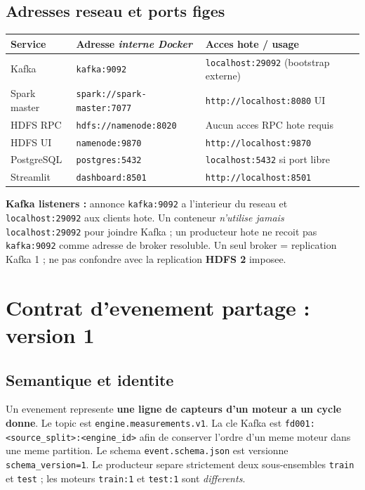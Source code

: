 \documentclass[10pt,a4paper]{article}
\newcommand{\code}[1]{{\small\ttfamily\nolinkurl{#1}}}
\begin{document}
\subsection{Adresses reseau et ports figes}
\begin{tabularx}{\linewidth}{@{}p{30mm}p{46mm}Y@{}}
\toprule
\textbf{Service} & \textbf{Adresse \emph{interne Docker}} & \textbf{Acces hote / usage}\\\midrule
Kafka & \code{kafka:9092} & \code{localhost:29092} (bootstrap externe)\\
Spark master & \code{spark://spark-master:7077} & \code{http://localhost:8080} UI\\
HDFS RPC & \code{hdfs://namenode:8020} & Aucun acces RPC hote requis\\
HDFS UI & \code{namenode:9870} & \code{http://localhost:9870}\\
PostgreSQL & \code{postgres:5432} & \code{localhost:5432} si port libre\\
Streamlit & \code{dashboard:8501} & \code{http://localhost:8501}\\
\bottomrule
\end{tabularx}
\textbf{Kafka listeners :} annonce \code{kafka:9092} a l'interieur du reseau et \code{localhost:29092} aux clients hote. Un conteneur \emph{n'utilise jamais} \code{localhost:29092} pour joindre Kafka ; un producteur hote ne recoit pas \code{kafka:9092} comme adresse de broker resoluble. Un seul broker = replication Kafka 1 ; ne pas confondre avec la replication \textbf{HDFS 2} imposee.

\section{Contrat d'evenement partage : version 1}
\subsection{Semantique et identite}
Un evenement represente \textbf{une ligne de capteurs d'un moteur a un cycle donne}. Le topic est \code{engine.measurements.v1}. La cle Kafka est \code{fd001:<source_split>:<engine_id>} afin de conserver l'ordre d'un meme moteur dans une meme partition. Le schema \code{event.schema.json} est versionne \code{schema_version=1}. Le producteur separe strictement deux sous-ensembles \code{train} et \code{test} ; les moteurs \code{train:1} et \code{test:1} sont \emph{differents}.
\end{document}
